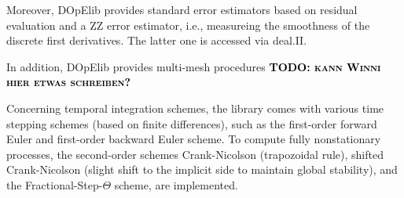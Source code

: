 \documentclass[prodmode,acmtoms]{acmsmall}
\numberwithin{equation}{section}
\newcommand{\todo}[1]{\textbf{\textsc{\textcolor{black}{TODO: #1}}}}
\begin{document}
Moreover, DOpElib provides standard error estimators based on residual evaluation and 
a ZZ error estimator, i.e., measureing the smoothness of the discrete first derivatives.
The latter one is accessed via deal.II. 

In addition, DOpElib provides multi-mesh procedures 
\todo{kann Winni hier etwas schreiben?}

Concerning temporal integration schemes, the library comes 
with various time stepping schemes (based on finite differences), 
such as the first-order forward Euler and first-order backward Euler scheme. 
To compute fully nonstationary processes, the second-order schemes
Crank-Nicolson (trapozoidal rule), 
shifted Crank-Nicolson (slight shift to the implicit side to maintain
global stability), 
and the Fractional-Step-$\Theta$ scheme, are implemented.
\end{document}
